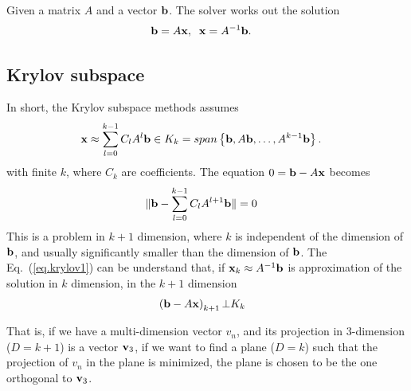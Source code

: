 
Given a matrix $A$ and a vector ${\bf b}$. The solver works out the solution
\begin{equation}
\begin{split}
&{\bf b}=A{\bf x},\;\;{\bf x} = A^{-1}{\bf b}.
\end{split}
\end{equation}

\subsection{\label{Krylov_subspace}Krylov subspace}

In short, the Krylov subspace methods assumes
\begin{equation}
\begin{split}
&{\bf x} \approx \sum _{l=0}^{k-1} C_lA^l{\bf b}\in K_k=span\left\{{\bf b},A{\bf b},\ldots,A^{k-1}{\bf b}\right\}.
\end{split}
\end{equation}
with finite $k$, where $C_k$ are coefficients. The equation $0={\bf b}-A{\bf x}$ becomes
\begin{equation}
\begin{split}
&\|{\bf b}- \sum _{l=0}^{k-1} C_lA^{l+1}{\bf b}\|=0
\end{split}
\label{eq.krylov1}
\end{equation}
This is a problem in $k+1$ dimension, where $k$ is independent of the dimension of ${\bf b}$, and usually significantly smaller than the dimension of ${\bf b}$. The Eq.~(\ref{eq.krylov1}) can be understand that, if ${\bf x}_k\approx A^{-1}{\bf b}$ is approximation of the solution in $k$ dimension, in the $k+1$ dimension
\begin{equation}
\begin{split}
&\left({\bf b}-A{\bf x}\right)_{k+1} \bot K_k
\end{split}
\label{eq.krylov2}
\end{equation}

That is, if we have a multi-dimension vector $v_n$, and its projection in 3-dimension ($D=k+1$) is a vector ${\bf v}_3$, if we want to find a plane ($D=k$) such that the projection of $v_n$ in the plane is minimized, the plane is chosen to be the one orthogonal to ${\bf v}_3$.






